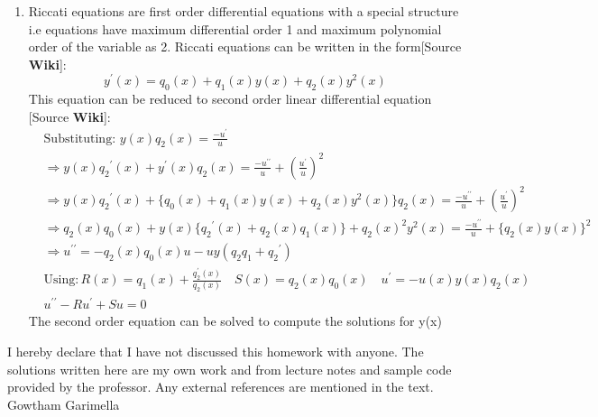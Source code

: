 \begin{enumerate}
  
  \item Riccati equations are 	first order differential equations with a special structure i.e equations have maximum differential order 1 and maximum polynomial order of the 
  variable as 2. Riccati equations can be written in the form[Source \textbf{Wiki}]:
  \begin{equation*}
   y^{\prime}(x) = q_0(x) + q_1(x) y(x) + q_2(x) y^2 (x)
  \end{equation*}
  This equation can be reduced to second order linear differential equation [Source \textbf{Wiki}]:
  \begin{align*}
   &\text{Substituting: } y(x) q_2(x) = \frac{-u^{\prime}}{u}\\
   &\Rightarrow y(x) {q_2}^\prime(x) + y^\prime(x)q_2(x) = \frac{-u^{\prime\prime}}{u} + \left(\frac{u^{\prime}}{u}\right)^2\\
   &\Rightarrow y(x) {q_2}^\prime(x) + \{q_0(x) + q_1(x) y(x) + q_2(x) y^2(x)\} q_2(x) = \frac{-u^{\prime\prime}}{u} + \left(\frac{u^{\prime}}{u}\right)^2\\
   &\Rightarrow q_2(x) q_0(x) +  y(x) \{{q_2}^\prime(x)+ q_2(x) q_1(x)\} + q_2(x)^2 y^2(x)  = \frac{-u^{\prime\prime}}{u} + \{q_2(x) y(x)\}^2 \\
   &\Rightarrow u^{\prime\prime} = -q_2(x) q_0(x) u - uy(q_2 q_1 + {q_2}^\prime) \\
   & \text{Using}: R(x) = q_1(x) + \frac{q_2^\prime (x)}{q_2(x)} \quad S(x) = q_2(x) q_0(x) \quad u^\prime = -u(x)y(x)q_2(x)\\
   & u^{\prime\prime} -R u^{\prime} + S u = 0
  \end{align*}
  The second order equation can be solved to compute the solutions for y(x)\\
  

\end{enumerate} 
\vfill
\begin{acknowledgements}
I hereby declare that I have not discussed this homework with anyone. The solutions written here are my own work and  from lecture notes and sample code provided by the professor. Any 
external references are mentioned in the text.
\flushright Gowtham Garimella
\end{acknowledgements}





